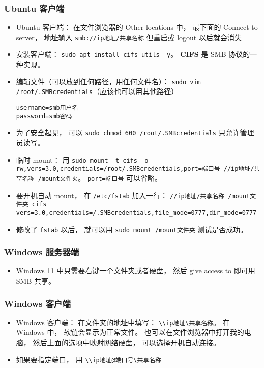 \subsubsection{Ubuntu 客户端}
\begin{itemize}
\item Ubuntu 客户端： 在文件浏览器的 Other locations 中， 最下面的 Connect to server， 地址输入 \verb|smb://ip地址/共享名称| 但重启或 logout 以后就会消失
\item 安装客户端： \verb|sudo apt install cifs-utils -y|。 \textbf{CIFS} 是 SMB 协议的一种实现。
\item 编辑文件（可以放到任何路径，用任何文件名）： \verb|sudo vim /root/.SMBcredentials|（应该也可以用其他路径）
\begin{lstlisting}[language=none]
username=smb用户名
password=smb密码
\end{lstlisting}
\item 为了安全起见， 可以 \verb|sudo chmod 600 /root/.SMBcredentials| 只允许管理员读写。
\item 临时 mount： 用 \verb|sudo mount -t cifs -o rw,vers=3.0,credentials=/root/.SMBcredentials,port=端口号 //ip地址/共享名称 /mount文件夹|。 \verb|port=端口号| 可以省略。
\item 要开机自动 mount， 在 \verb|/etc/fstab| 加入一行： \verb|//ip地址/共享名称 /mount文件夹 cifs vers=3.0,credentials=/.SMBcredentials,file_mode=0777,dir_mode=0777|
\item 修改了 \verb|fstab| 以后， 就可以用 \verb|sudo mount /mount文件夹| 测试是否成功。
\end{itemize}

\subsubsection{Windows 服务器端}
\begin{itemize}
\item Windows 11 中只需要右键一个文件夹或者硬盘， 然后 give access to 即可用 SMB 共享。
\end{itemize}

\subsubsection{Windows 客户端}
\begin{itemize}
\item Windows 客户端： 在文件夹的地址中填写： \verb|\\ip地址\共享名称|。 在 Windows 中， 软链会显示为正常文件。 也可以在文件浏览器中打开我的电脑， 然后上面的选项中映射网络硬盘， 可以选择开机自动连接。
\item 如果要指定端口， 用 \verb|\\ip地址@端口号\共享名称|
\end{itemize}

